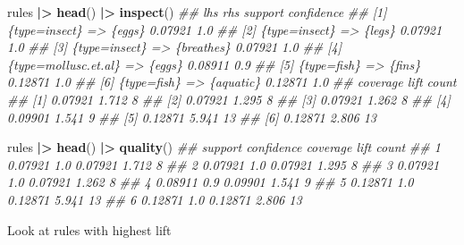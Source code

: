\documentclass[
  notitlepage]{book}
\newenvironment{Shaded}{\begin{snugshade}}{\end{snugshade}}
\newcommand{\CommentTok}[1]{\textcolor[rgb]{0.56,0.35,0.01}{\textit{#1}}}
\newcommand{\ErrorTok}[1]{\textcolor[rgb]{0.64,0.00,0.00}{\textbf{#1}}}
\newcommand{\KeywordTok}[1]{\textcolor[rgb]{0.13,0.29,0.53}{\textbf{#1}}}
\newcommand{\NormalTok}[1]{#1}
\newcommand{\OperatorTok}[1]{\textcolor[rgb]{0.81,0.36,0.00}{\textbf{#1}}}
\newcommand{\StringTok}[1]{\textcolor[rgb]{0.31,0.60,0.02}{#1}}
\begin{document}
\begin{Shaded}
\begin{Highlighting}[]
\NormalTok{rules }\OperatorTok{|}\ErrorTok{\textgreater{}}\StringTok{ }\KeywordTok{head}\NormalTok{() }\OperatorTok{|}\ErrorTok{\textgreater{}}\StringTok{ }\KeywordTok{inspect}\NormalTok{()}
\CommentTok{\#\#     lhs                     rhs        support confidence}
\CommentTok{\#\# [1] \{type=insect\}        =\textgreater{} \{eggs\}     0.07921 1.0       }
\CommentTok{\#\# [2] \{type=insect\}        =\textgreater{} \{legs\}     0.07921 1.0       }
\CommentTok{\#\# [3] \{type=insect\}        =\textgreater{} \{breathes\} 0.07921 1.0       }
\CommentTok{\#\# [4] \{type=mollusc.et.al\} =\textgreater{} \{eggs\}     0.08911 0.9       }
\CommentTok{\#\# [5] \{type=fish\}          =\textgreater{} \{fins\}     0.12871 1.0       }
\CommentTok{\#\# [6] \{type=fish\}          =\textgreater{} \{aquatic\}  0.12871 1.0       }
\CommentTok{\#\#     coverage lift  count}
\CommentTok{\#\# [1] 0.07921  1.712  8   }
\CommentTok{\#\# [2] 0.07921  1.295  8   }
\CommentTok{\#\# [3] 0.07921  1.262  8   }
\CommentTok{\#\# [4] 0.09901  1.541  9   }
\CommentTok{\#\# [5] 0.12871  5.941 13   }
\CommentTok{\#\# [6] 0.12871  2.806 13}
\end{Highlighting}
\end{Shaded}

\begin{Shaded}
\begin{Highlighting}[]
\NormalTok{rules }\OperatorTok{|}\ErrorTok{\textgreater{}}\StringTok{ }\KeywordTok{head}\NormalTok{() }\OperatorTok{|}\ErrorTok{\textgreater{}}\StringTok{ }\KeywordTok{quality}\NormalTok{()}
\CommentTok{\#\#   support confidence coverage  lift count}
\CommentTok{\#\# 1 0.07921        1.0  0.07921 1.712     8}
\CommentTok{\#\# 2 0.07921        1.0  0.07921 1.295     8}
\CommentTok{\#\# 3 0.07921        1.0  0.07921 1.262     8}
\CommentTok{\#\# 4 0.08911        0.9  0.09901 1.541     9}
\CommentTok{\#\# 5 0.12871        1.0  0.12871 5.941    13}
\CommentTok{\#\# 6 0.12871        1.0  0.12871 2.806    13}
\end{Highlighting}
\end{Shaded}

Look at rules with highest lift
\end{document}
